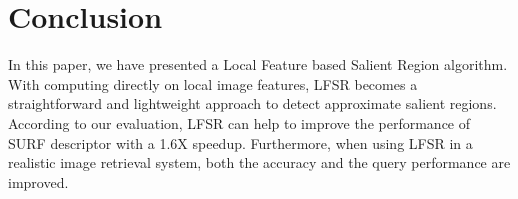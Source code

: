 \section{Conclusion}
\label{sec:conclusion}

In this paper, we have presented a Local Feature based Salient Region algorithm. With computing directly on local image features, LFSR becomes a straightforward and lightweight approach to detect approximate salient regions. According to our evaluation, LFSR can help to improve the performance of SURF descriptor with a 1.6X speedup. Furthermore, when using LFSR in a realistic image retrieval system, both the accuracy and the query performance are improved. 